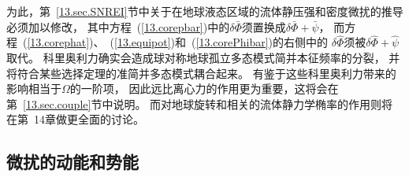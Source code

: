{{为此，第~\ref{13.sec.SNREI}节中关于在地球液态区域的流体静压强和密度微扰的推导必须加以修改，
其中方程~(\ref{13.corepbar})中的$\delta\bar{\Phi}$须置换成$\delta\bar{\Phi}+\bar{\psi}$，
而方程~(\ref{13.corephat})、~(\ref{13.equipot})和~(\ref{13.corePhibar})的右侧中的
$\delta\hat{\Phi}$须被$\delta\hat{\Phi}+\hat{\psi}$取代。
科里奥利力确实会造成球对称地球孤立多态模式简并本征频率的分裂，
并将符合某些选择定理的准简并多态模式耦合起来。
有鉴于这些科里奥利力带来的影响相当于$\Omega$的一阶项，
因此远比离心力的作用更为重要，这将会在第~\ref{13.sec.couple}节中说明。
而对地球旋转和相关的流体静力学椭率的作用则将在第~14章做更全面的讨论。
%
%


\subsection{微扰的动能和势能}
%
%
%
%
%
%

}}

